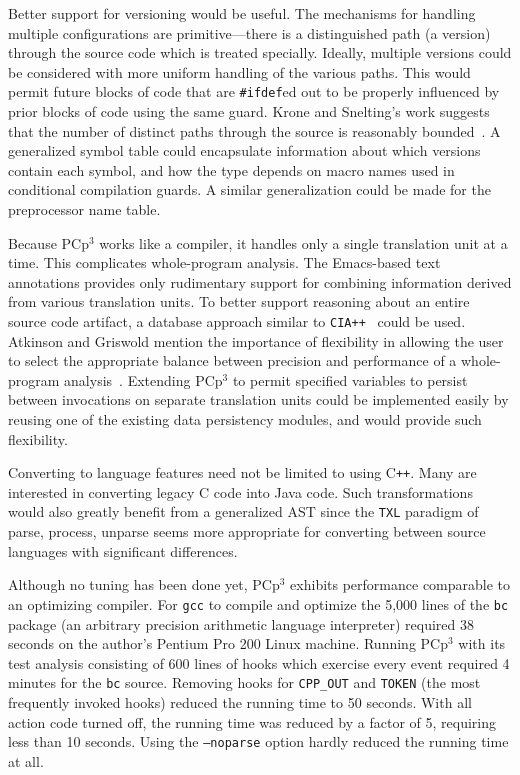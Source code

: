 \documentclass{article}
\newcommand{\pcp}{\mbox{\textsf{PCp}$^3$}}
\newcommand{\CPP}{\mbox{C\texttt{++}}}
\newcommand{\C}{\mbox{C}}
\newcommand{\ppd}[1]{\texttt{\##1}}
\begin{document}
Better support for versioning would be useful. The mechanisms for
handling multiple configurations are primitive---there is a
distinguished path (a version) through the source code which is treated
specially.  Ideally, multiple versions could be considered with more
uniform handling of the various paths.  This would
permit future blocks of code that are \ppd{ifdef}ed out to be properly
influenced by prior blocks of code using the same guard.  Krone and
Snelting's work suggests that the number of distinct paths through the
source is reasonably bounded~\cite{Krone94}.  A generalized symbol table
could encapsulate information about which versions contain each symbol,
and how the type depends on macro names used in conditional compilation
guards.  A similar generalization could be made for the preprocessor
name table.

Because \pcp{} works like a compiler, it handles only a single
translation unit at a time.  This complicates whole-program analysis.
The Emacs-based text annotations provides only rudimentary support for
combining information derived from various translation units.
To better support reasoning about an entire source code
artifact, a database approach similar to \texttt{CIA++}~\cite{CIA++90}
could be used.  Atkinson and Griswold mention the importance of flexibility in allowing
the user to select the appropriate balance between precision and
performance of a whole-program analysis~\cite{Atkinson96}.  Extending
\pcp{} to permit specified variables to persist between invocations on separate
translation units could be implemented easily by reusing one of the
existing data persistency modules, and would provide such flexibility.

Converting to language features need not be limited to using \CPP{}.
Many are interested in converting legacy \C{} code into Java code.  Such
transformations would also greatly benefit from a generalized AST since
the \texttt{TXL} paradigm of parse, process, unparse \cite{TXL} seems
more appropriate for converting between source languages with
significant differences.

Although no tuning has been done yet, \pcp{} exhibits performance
comparable to an optimizing compiler.  For \texttt{gcc} to compile and
optimize the 5,000 lines of the \texttt{bc} package (an arbitrary
precision arithmetic language interpreter) required 38 seconds on the
author's Pentium Pro 200 Linux machine. Running \pcp{} with its test
analysis consisting of 600 lines of hooks which exercise every event
required 4 minutes for the \texttt{bc} source.  Removing hooks for
\texttt{CPP\_OUT} and \texttt{TOKEN} (the most frequently invoked hooks)
reduced the running time to 50 seconds.  With all action code turned
off, the running time was reduced by a factor of 5, requiring less than
10 seconds.  Using the \texttt{--noparse} option hardly reduced the
running time at all.
\end{document}
